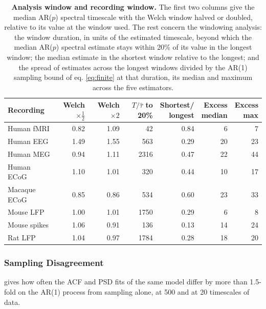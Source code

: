 \documentclass[pdflatex,sn-mathphys-num]{sn-jnl}
\begin{document}
\begin{table}[h]
\caption{\textbf{Analysis window and recording window.} The first two columns give the median AR($p$) spectral timescale with the Welch window halved or doubled, relative to its value at the window used. The rest concern the windowing analysis: the window duration, in units of the estimated timescale, beyond which the median AR($p$) spectral estimate stays within 20\% of its value in the longest window; the median estimate in the shortest window relative to the longest; and the spread of estimates across the longest windows divided by the AR(1) sampling bound of eq. \ref{eq:finite} at that duration, its median and maximum across the five estimators.}\label{tab:s_windows}
\setlength{\tabcolsep}{3pt}
\begin{tabular}{lrrrrrr}
\toprule
Recording & \shortstack[c]{Welch \\ $\times\tfrac12$} & \shortstack[c]{Welch \\ $\times 2$} & \shortstack[c]{$T/\hat\tau$ \\ to 20\%} & \shortstack[c]{Shortest/ \\ longest} & \shortstack[c]{Excess \\ median} & \shortstack[c]{Excess \\ max} \\
\midrule
Human fMRI & 0.82 & 1.09 & 42 & 0.84 & 6 & 7 \\
Human EEG & 1.49 & 1.55 & 563 & 0.29 & 20 & 23 \\
Human MEG & 0.94 & 1.11 & 2316 & 0.47 & 22 & 44 \\
Human ECoG & 1.10 & 1.01 & 320 & 0.44 & 10 & 17 \\
Macaque ECoG & 0.85 & 0.86 & 534 & 0.60 & 23 & 33 \\
Mouse LFP & 1.00 & 1.01 & 1750 & 0.29 & 6 & 8 \\
Mouse spikes & 1.06 & 0.91 & 136 & 0.13 & 14 & 24 \\
Rat LFP & 1.04 & 0.97 & 1784 & 0.28 & 18 & 20 \\
\bottomrule
\end{tabular}
\end{table}

\subsubsection*{Sampling Disagreement}

 gives how often the ACF and PSD fits of the same model differ by more than 1.5-fold on the AR(1) process from sampling alone, at 500 and at 20 timescales of data.
\end{document}
